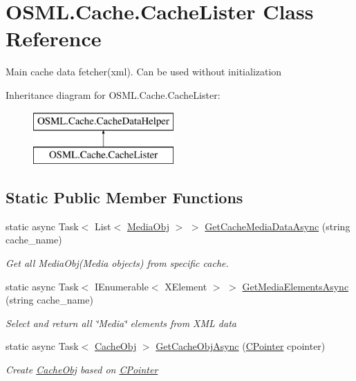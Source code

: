 \hypertarget{classOSML_1_1Cache_1_1CacheLister}{}\section{O\+S\+M\+L.\+Cache.\+Cache\+Lister Class Reference}
\label{classOSML_1_1Cache_1_1CacheLister}


Main cache data fetcher(xml). Can be used without initialization  


Inheritance diagram for O\+S\+M\+L.\+Cache.\+Cache\+Lister\+:\begin{figure}[H]
\begin{center}
\leavevmode
\includegraphics[height=2.000000cm]{classOSML_1_1Cache_1_1CacheLister}
\end{center}
\end{figure}
\subsection*{Static Public Member Functions}
\begin{DoxyCompactItemize}
\item 
static async Task$<$ List$<$ \mbox{\hyperlink{classOSML_1_1Media_1_1MediaObj}{Media\+Obj}} $>$ $>$ \mbox{\hyperlink{classOSML_1_1Cache_1_1CacheLister_a5ea2d67bd366c49b406ad83bc226a75e}{Get\+Cache\+Media\+Data\+Async}} (string cache\+\_\+name)
\begin{DoxyCompactList}\small\item\em Get all Media\+Obj(\+Media objects) from specific cache. \end{DoxyCompactList}\item 
static async Task$<$ I\+Enumerable$<$ X\+Element $>$ $>$ \mbox{\hyperlink{classOSML_1_1Cache_1_1CacheLister_a57bb277452fb70ba99b67f98c4ec851d}{Get\+Media\+Elements\+Async}} (string cache\+\_\+name)
\begin{DoxyCompactList}\small\item\em Select and return all \char`\"{}\+Media\char`\"{} elements from X\+ML data \end{DoxyCompactList}\item 
static async Task$<$ \mbox{\hyperlink{classOSML_1_1Cache_1_1CacheObj}{Cache\+Obj}} $>$ \mbox{\hyperlink{classOSML_1_1Cache_1_1CacheLister_a027390d43931a6594324d18550da83aa}{Get\+Cache\+Obj\+Async}} (\mbox{\hyperlink{classOSML_1_1Cache_1_1CPointer}{C\+Pointer}} cpointer)
\begin{DoxyCompactList}\small\item\em Create \mbox{\hyperlink{classOSML_1_1Cache_1_1CacheObj}{Cache\+Obj}} based on \mbox{\hyperlink{classOSML_1_1Cache_1_1CPointer}{C\+Pointer}} \end{DoxyCompactList}\end{DoxyCompactItemize}



